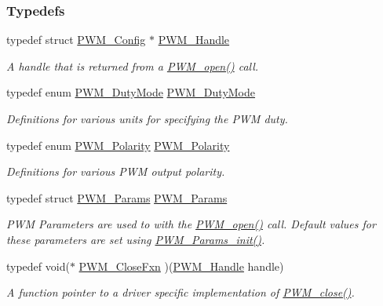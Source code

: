 \subsubsection*{Typedefs}
\begin{DoxyCompactItemize}
\item 
typedef struct \hyperlink{struct_p_w_m___config}{P\-W\-M\-\_\-\-Config} $\ast$ \hyperlink{_p_w_m_8h_afdefc765f42bbad4dca246fda6e1354b}{P\-W\-M\-\_\-\-Handle}
\begin{DoxyCompactList}\small\item\em A handle that is returned from a \hyperlink{_p_w_m_8h_ac963beab0c5c6901bf852f175028aeaf}{P\-W\-M\-\_\-open()} call. \end{DoxyCompactList}\item 
typedef enum \hyperlink{_p_w_m_8h_a6c5ba2703cb9cc02773b5073046c1607}{P\-W\-M\-\_\-\-Duty\-Mode} \hyperlink{_p_w_m_8h_a19cd06b0c3560cfdf4125d1bc70a155e}{P\-W\-M\-\_\-\-Duty\-Mode}
\begin{DoxyCompactList}\small\item\em Definitions for various units for specifying the P\-W\-M duty. \end{DoxyCompactList}\item 
typedef enum \hyperlink{_p_w_m_8h_affa60cc974f99db4aeafc9f6524ec593}{P\-W\-M\-\_\-\-Polarity} \hyperlink{_p_w_m_8h_a15b860dd4dbdba68833b71c4d9f2b929}{P\-W\-M\-\_\-\-Polarity}
\begin{DoxyCompactList}\small\item\em Definitions for various P\-W\-M output polarity. \end{DoxyCompactList}\item 
typedef struct \hyperlink{struct_p_w_m___params}{P\-W\-M\-\_\-\-Params} \hyperlink{_p_w_m_8h_ac7349e4fc779fd744daf79b403269167}{P\-W\-M\-\_\-\-Params}
\begin{DoxyCompactList}\small\item\em P\-W\-M Parameters are used to with the \hyperlink{_p_w_m_8h_ac963beab0c5c6901bf852f175028aeaf}{P\-W\-M\-\_\-open()} call. Default values for these parameters are set using \hyperlink{_p_w_m_8h_acbdd3192f9f06bf689e4a3855926dcac}{P\-W\-M\-\_\-\-Params\-\_\-init()}. \end{DoxyCompactList}\item 
typedef void($\ast$ \hyperlink{_p_w_m_8h_a20139b14a696a3e8b0d13adb73760aac}{P\-W\-M\-\_\-\-Close\-Fxn} )(\hyperlink{_p_w_m_8h_afdefc765f42bbad4dca246fda6e1354b}{P\-W\-M\-\_\-\-Handle} handle)
\begin{DoxyCompactList}\small\item\em A function pointer to a driver specific implementation of \hyperlink{_p_w_m_8h_a0e0f5899b067d27653db566fb148db11}{P\-W\-M\-\_\-close()}. \end{DoxyCompactList}\item 

\end{DoxyCompactItemize}
